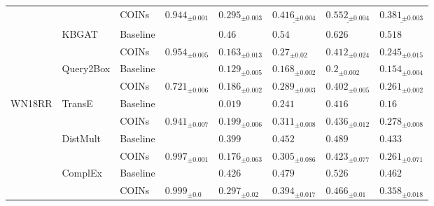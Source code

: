 \begin{table}[ht!]
\begin{adjustbox}{width=\textwidth}
\begin{tabular}{llllllll}
         &           & COINs &  ${{0.944}_{\pm 0.001}}$ &     $\mathbf{{0.295}_{\pm 0.003}}$ &  $\underline{{0.416}_{\pm 0.004}}$ &  $\underline{{0.552}_{\pm 0.004}}$ &  $\underline{{0.381}_{\pm 0.003}}$ \\
         & KBGAT & Baseline &                          &                         ${{0.46}}$ &                         ${{0.54}}$ &                        ${{0.626}}$ &                        ${{0.518}}$ \\
         &           & COINs &  ${{0.954}_{\pm 0.005}}$ &            ${{0.163}_{\pm 0.013}}$ &              ${{0.27}_{\pm 0.02}}$ &            ${{0.412}_{\pm 0.024}}$ &            ${{0.245}_{\pm 0.015}}$ \\
         & Query2Box & Baseline &                          &            ${{0.129}_{\pm 0.005}}$ &            ${{0.168}_{\pm 0.002}}$ &              ${{0.2}_{\pm 0.002}}$ &            ${{0.154}_{\pm 0.004}}$ \\
         &           & COINs &  ${{0.721}_{\pm 0.006}}$ &     $\mathbf{{0.186}_{\pm 0.002}}$ &     $\mathbf{{0.289}_{\pm 0.003}}$ &     $\mathbf{{0.402}_{\pm 0.005}}$ &     $\mathbf{{0.261}_{\pm 0.002}}$ \\
\midrule
WN18RR & TransE & Baseline &                          &                        ${{0.019}}$ &                        ${{0.241}}$ &                        ${{0.416}}$ &                         ${{0.16}}$ \\
         &           & COINs &  ${{0.941}_{\pm 0.007}}$ &     $\mathbf{{0.199}_{\pm 0.006}}$ &     $\mathbf{{0.311}_{\pm 0.008}}$ &     $\mathbf{{0.436}_{\pm 0.012}}$ &     $\mathbf{{0.278}_{\pm 0.008}}$ \\
         & DistMult & Baseline &                          &                        ${{0.399}}$ &                        ${{0.452}}$ &                        ${{0.489}}$ &                        ${{0.433}}$ \\
         &           & COINs &  ${{0.997}_{\pm 0.001}}$ &            ${{0.176}_{\pm 0.063}}$ &            ${{0.305}_{\pm 0.086}}$ &            ${{0.423}_{\pm 0.077}}$ &            ${{0.261}_{\pm 0.071}}$ \\
         & ComplEx & Baseline &                          &                        ${{0.426}}$ &                        ${{0.479}}$ &                        ${{0.526}}$ &                        ${{0.462}}$ \\
         &           & COINs &    ${{0.999}_{\pm 0.0}}$ &             ${{0.297}_{\pm 0.02}}$ &            ${{0.394}_{\pm 0.017}}$ &             ${{0.466}_{\pm 0.01}}$ &            ${{0.358}_{\pm 0.018}}$ \\

\end{tabular}
\end{adjustbox}
\end{table}
